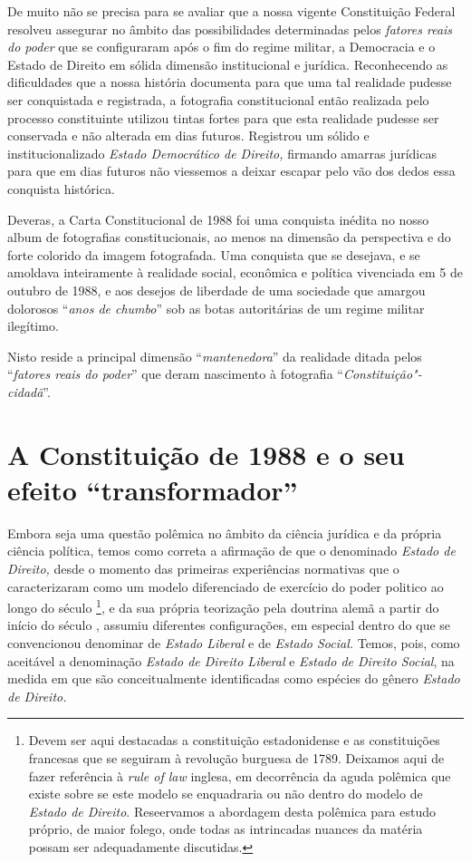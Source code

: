 De muito não se precisa para se avaliar que a nossa vigente Constituição
Federal resolveu assegurar no âmbito das possibilidades determinadas
pelos \emph{fatores reais do poder} que se configuraram após o fim do
regime militar, a Democracia e o Estado de Direito em sólida dimensão
institucional e jurídica. Reconhecendo as dificuldades que a nossa
história documenta para que uma tal realidade pudesse ser conquistada e
registrada, a fotografia constitucional então realizada pelo processo
constituinte utilizou tintas fortes para que esta realidade pudesse ser
conservada e não alterada em dias futuros. Registrou um sólido e
institucionalizado \emph{Estado Democrático de Direito,} firmando
amarras jurídicas para que em dias futuros não viessemos a deixar
escapar pelo vão dos dedos essa conquista histórica.

Deveras, a Carta Constitucional de 1988 foi uma conquista inédita no
nosso album de fotografias constitucionais, ao menos na dimensão da
perspectiva e do forte colorido da imagem fotografada. Uma conquista que
se desejava, e se amoldava inteiramente à realidade social, econômica e
política vivenciada em 5 de outubro de 1988, e aos desejos de liberdade
de uma sociedade que amargou dolorosos ``\emph{anos de chumbo}'' sob as
botas autoritárias de um regime militar ilegítimo.

Nisto reside a principal dimensão ``\emph{mantenedora}'' da realidade
ditada pelos ``\emph{fatores reais do poder}'' que deram nascimento à
fotografia ``\emph{Constituição"-cidadã}''.

\section{A Constituição de 1988 e o seu efeito
``transformador''}

Embora seja uma questão polêmica no âmbito da ciência jurídica e da
própria ciência política, temos como correta a afirmação de que o
denominado \emph{Estado de Direito,} desde o momento das primeiras
experiências normativas que o caracterizaram como um modelo diferenciado
de exercício do poder politico ao longo do século \footnote{Devem
  ser aqui destacadas a constituição estadonidense e as constituições
  francesas que se seguiram à revolução burguesa de 1789. Deixamos aqui
  de fazer referência à \emph{rule of law} inglesa, em decorrência da
  aguda polêmica que existe sobre se este modelo se enquadraria ou não
  dentro do modelo de \emph{Estado de Direito}. Reseervamos a abordagem
  desta polêmica para estudo próprio, de maior folego, onde todas as
  intrincadas nuances da matéria possam ser adequadamente discutidas.},
e da sua própria teorização pela doutrina alemã a partir do início do
século , assumiu diferentes configurações, em especial dentro do que
se convencionou denominar de \emph{Estado Liberal} e de \emph{Estado
Social.} Temos, pois, como aceitável a denominação \emph{Estado de
Direito Liberal} e \emph{Estado de Direito Social}, na medida em que são
conceitualmente identificadas como espécies do gênero \emph{Estado de
Direito.}

